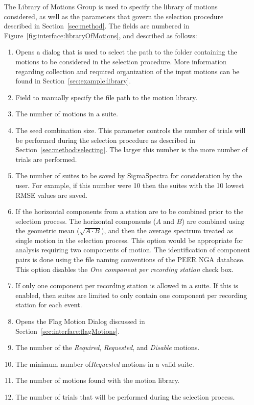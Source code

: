 \documentclass[11pt]{article}
\begin{document}
The Library of Motions Group is used to specify the library of motions
considered, as well as the parameters that govern the selection procedure
described in Section~\ref{sec:method}. The fields are numbered in
Figure~\ref{fig:interface:libraryOfMotions}, and described as follows:
\begin{enumerate}
  \item Opens a dialog that is used to select the path to the folder containing
	the motions to be considered in the selection procedure. More information
	regarding collection and required organization of the input motions can be
	found in Section~\ref{sec:example:library}.
  \item Field to manually specify the file path to the motion library.
  \item The number of motions in a suite.
  \item The seed combination size. This parameter controls the number of trials
	will be performed during the selection procedure as described in
	Section~\ref{sec:method:selecting}. The larger this number is the more
	number of trials are performed.
  \item The number of suites to be saved by SigmaSpectra for consideration by
	the user. For example, if this number were 10 then the suites with the 10
	lowest RMSE values are saved.
  \item If the horizontal components from a station are to be combined prior to
	the selection process. The horizontal components ($A$ and $B$) are combined
	using the geometric mean ($\sqrt{A \cdot B}$), and then the average spectrum
	treated as single motion in the selection process. This option would be
	appropriate for analysis requiring two components of motion. The
	identification of component pairs is done using the file naming conventions
	of the PEER NGA database. This option disables the \emph{One component per
	recording station} check box.
  \item If only one component per recording station is allowed in a suite. If
	this is enabled, then suites are limited to only contain one component per
	recording station for each event.
  \item Opens the Flag Motion Dialog discussed in
	Section~\ref{sec:interface:flagMotions}.
  \item The number of the \emph{Required}, \emph{Requested}, and
	\emph{Disable} motions.
  \item The minimum number of\emph{Requested} motions in a valid suite.
  \item The number of motions found with the motion library.
  \item The number of trials that will be performed during the selection process.
\end{enumerate}
\end{document}

